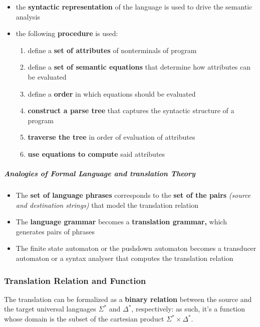 \documentclass[english]{article}
\begin{document}
\begin{itemize}
  \item the \textbf{syntactic representation} of the language is used to drive the semantic analysis
  \item the following \textbf{procedure} is used:
        \begin{enumerate}
          \item define a \textbf{set of attributes} of nonterminals of program
          \item define a \textbf{set of semantic equations} that determine how attributes can be evaluated
          \item define a \textbf{order} in which equations should be evaluated
          \item \textbf{construct a parse tree} that captures the syntactic structure of a program
          \item \textbf{traverse the tree }in order of evaluation of attributes
          \item \textbf{use equations to compute} said attributes
        \end{enumerate}
\end{itemize}

\subparagraph*{Analogies of Formal Language and translation Theory}

\begin{itemize}
  \item The \textbf{set of language phrases} corresponds to the \textbf{set of the pairs} \textit{(source and destination strings)} that model the translation relation
  \item The \textbf{language grammar} becomes a \textbf{translation grammar,} which generates pairs of phrases
  \item The finite state automaton or the pushdown automaton becomes a transducer automaton or a syntax analyser that computes the translation relation
\end{itemize}

\subsubsection{Translation Relation and Function}

The translation can be formalized as a \textbf{binary relation} between the source and the target universal languages \(\Sigma^\ast\) and \(\Delta^\ast\), respectively:
as such, it's a function whose domain is the subset of the cartesian product \(\Sigma^\ast \times \Delta^\ast\).
\end{document}
